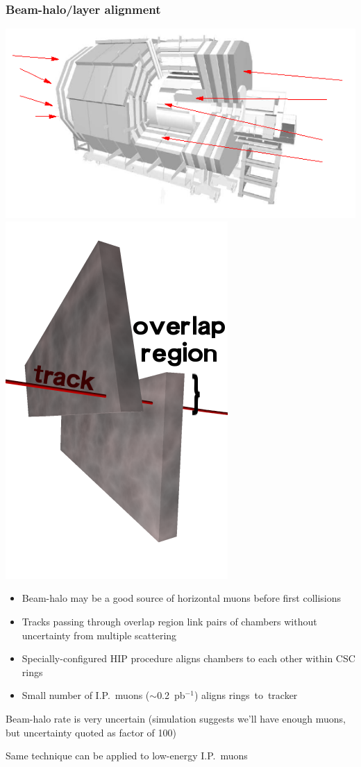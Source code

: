 \documentclass[compress]{beamer}
\begin{document}
\begin{frame}
\frametitle{Beam-halo/layer alignment}

\vspace{-0.5 cm}
\begin{center}
\includegraphics[width=0.4\linewidth]{beam-halo_schematic.png} \hspace{0.5 cm} \includegraphics[width=0.15\linewidth]{overlap.png}
\end{center}

\vspace{-0.5 cm}
\begin{itemize}
\item Beam-halo may be a good source of horizontal muons before first collisions
\item Tracks passing through overlap region link pairs of chambers without uncertainty from multiple scattering
\item Specially-configured HIP procedure aligns chambers to each other within CSC rings
\item Small number of I.P.\ muons ($\sim$0.2~pb$^{-1}$) aligns \mbox{rings to tracker\hspace{-1 cm}}
\end{itemize}

\vfill
Beam-halo rate is very uncertain (simulation suggests we'll have
enough muons, but uncertainty quoted as factor of 100)

\vfill
Same technique can be applied to low-energy I.P.\ muons
\end{frame}
\end{document}
